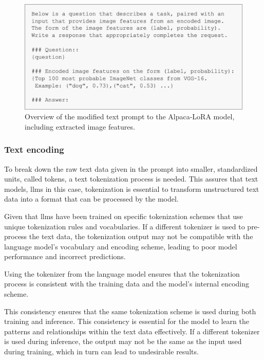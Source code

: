         \begin{figure}[htb]
            \centerline{
            \includegraphics[width=\textwidth]{images/alpaca_modified_prompt_format.png}}
            \caption{Overview of the modified text prompt to the Alpaca-LoRA model, including extracted image features.}
            \label{fig:alpaca_modified_prompt_format}
        \end{figure}


        \subsubsection{Text encoding}

        To break down the raw text data given in the prompt into smaller, standardized units, called tokens, a text tokenization process is needed. This assures that text models, \glspl{llm} in this case, tokenization is essential to transform unstructured text data into a format that can be processed by the model.
        
        Given that \glspl{llm} have been trained on specific tokenization schemes that use unique tokenization rules and vocabularies. If a different tokenizer is used to pre-process the text data, the tokenization output may not be compatible with the language model's vocabulary and encoding scheme, leading to poor model performance and incorrect predictions.
        
        Using the tokenizer from the language model ensures that the tokenization process is consistent with the training data and the model's internal encoding scheme. 
        
        This consistency ensures that the same tokenization scheme is used during both training and inference. This consistency is essential for the model to learn the patterns and relationships within the text data effectively. If a different tokenizer is used during inference, the output may not be the same as the input used during training, which in turn can lead to undesirable results.
        
